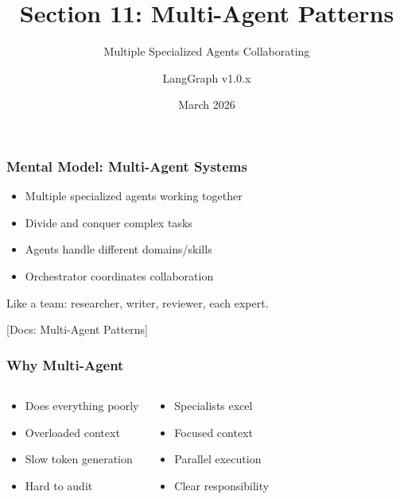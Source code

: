 \documentclass[aspectratio=169,11pt]{beamer}
\title{Section 11: Multi-Agent Patterns}
\subtitle{Multiple Specialized Agents Collaborating}
\author{LangGraph v1.0.x}
\date{March 2026}
\newcommand{\docref}[1]{{\scriptsize\color{docgray}[Docs: #1]}}
\begin{document}
\frame{\titlepage}

\begin{frame}
\frametitle{Mental Model: Multi-Agent Systems}
\begin{conceptbox}
\setlength{\itemsep}{1pt}
\begin{itemize}
\item Multiple specialized agents working together
\item Divide and conquer complex tasks
\item Agents handle different domains/skills
\item Orchestrator coordinates collaboration
\end{itemize}
\end{conceptbox}
\vspace{0.1cm}
\begin{tipbox}[Analogy]
Like a team: researcher, writer, reviewer, each expert.
\end{tipbox}
\docref{Multi-Agent Patterns}
\end{frame}

\begin{frame}
\frametitle{Why Multi-Agent}
\begin{columns}[T]
\begin{warningbox}
\setlength{\itemsep}{1pt}
\begin{itemize}
\item Does everything poorly
\item Overloaded context
\item Slow token generation
\item Hard to audit
\end{itemize}
\end{warningbox}
\begin{tipbox}
\setlength{\itemsep}{1pt}
\begin{itemize}
\item Specialists excel
\item Focused context
\item Parallel execution
\item Clear responsibility
\end{itemize}
\end{tipbox}
\end{columns}
\end{frame}
\end{document}
